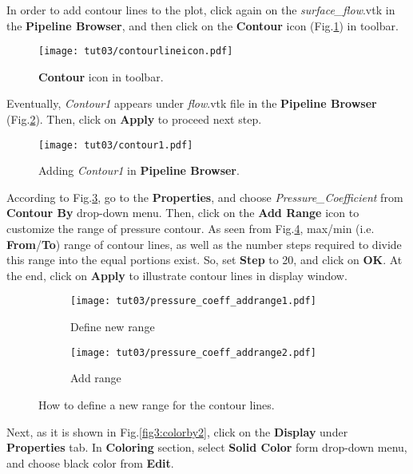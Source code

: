 In order to add contour lines to the plot, click again on the \textit{surface\_flow}.vtk in the \textbf{Pipeline Browser}, and then click on the \textbf{Contour} icon (Fig.\ref{fig3:contour_icon}) in toolbar.
\begin{figure}[htbp]
    \centering
    \texttt{[image: tut03/contourlineicon.pdf]}
    \caption{\textbf{Contour} icon in toolbar.}
    \label{fig3:contour_icon}
\end{figure}
Eventually, \textit{Contour1} appears under \textit{flow}.vtk file in the \textbf{Pipeline Browser} (Fig.\ref{fig3:contour1}). Then, click on \textbf{Apply} to proceed next step.
\begin{figure}[htbp]
    \centering
    \texttt{[image: tut03/contour1.pdf]}
    \caption{Adding \textit{Contour1} in \textbf{Pipeline Browser}.}
    \label{fig3:contour1}
\end{figure}
According to Fig.\ref{fig3:contourby a}, go to the \textbf{Properties}, and choose \textit{Pressure\_Coefficient} from \textbf{Contour By} drop-down menu. Then, click on the \textbf{Add Range} icon to customize the range of pressure contour. As seen from Fig.\ref{fig3:contourby b},  max/min (i.e. \textbf{From}/\textbf{To}) range of contour lines, as well as the number steps required to divide this range into the equal portions exist. So, set \textbf{Step} to 20, and click on \textbf{OK}. At the end, click on \textbf{Apply} to illustrate contour lines in display window.
\begin{figure}[htbp]
    \centering
     \begin{subfigure}[b]{.4\textwidth}
         \centering
         \texttt{[image: tut03/pressure\_coeff\_addrange1.pdf]}
         \caption{Define new range}
         \label{fig3:contourby a}
     \end{subfigure}
     \hfill
     \begin{subfigure}[b]{.4\textwidth}
         \centering
         \texttt{[image: tut03/pressure\_coeff\_addrange2.pdf]}
         \caption{Add range}
         \label{fig3:contourby b}
     \end{subfigure}     
    \caption{How to define a new range for the contour lines.}
    \label{fig3:contourby}
\end{figure}
Next, as it is shown in Fig.\ref{fig3:colorby2}, click on the \textbf{Display} under \textbf{Properties} tab. In \textbf{Coloring} section, select \textbf{Solid Color} form drop-down menu, and choose black color from \textbf{Edit}.
